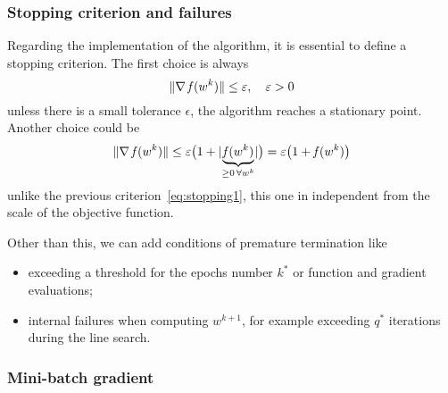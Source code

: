 \subsubsection*{Stopping criterion and failures}

Regarding the implementation of the algorithm, it is essential to define a stopping criterion. The first choice is always
\begin{equation}\label{eq:stopping1}
\lVert\nabla\operatorname*{\mathit{f}}(w^k)\rVert\leq\varepsilon,\quad\varepsilon>0
\end{equation}
unless there is a small tolerance $\epsilon$, the algorithm reaches a stationary point. Another choice could be
\begin{equation}\label{eq:stopping2}
\lVert\nabla\operatorname*{\mathit{f}}(w^k)\rVert\leq\varepsilon\bigl(1+\lvert\underbrace{\operatorname*{\mathit{f}}(w^k)}_{\geq0\,\forall w^k}\rvert\bigr)=\varepsilon\bigl(1+\operatorname*{\mathit{f}}(w^k)\bigr)
\end{equation}
unlike the previous criterion~\eqref{eq:stopping1}, this one in independent from the scale of the objective function.

Other than this, we can add conditions of premature termination like
\begin{itemize}
\item exceeding a threshold for the epochs number $k^\ast$ or function and gradient evaluations;
\item internal failures when computing $w^{k+1}$, for example exceeding $q^\ast$ iterations during the line search.
\end{itemize}


\subsubsection*{Mini-batch gradient}

